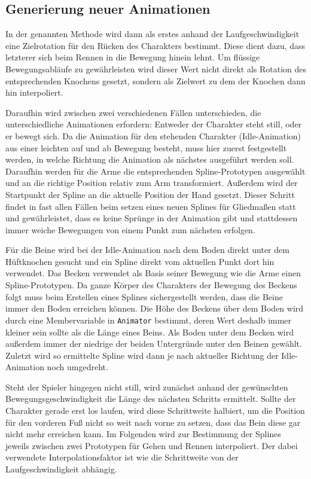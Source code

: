 \subsection{Generierung neuer Animationen}
In der genannten Methode wird dann als erstes anhand der Laufgeschwindigkeit eine Zielrotation für den Rücken des Charakters bestimmt. Diese dient dazu, dass letzterer sich beim Rennen in die Bewegung hinein lehnt. Um flüssige Bewegungsabläufe zu gewährleisten wird dieser Wert nicht direkt als Rotation des entsprechenden Knochens gesetzt, sondern als Zielwert zu dem der Knochen dann hin interpoliert.

Daraufhin wird zwischen zwei verschiedenen Fällen unterschieden, die unterschiedliche Animationen erfordern: Entweder der Charakter steht still, oder er bewegt sich. Da die Animation für den stehenden Charakter (Idle-Animation) aus einer leichten auf und ab Bewegung besteht, muss hier zuerst festgestellt werden, in welche Richtung die Animation als nächstes ausgeführt werden soll. Daraufhin werden für die Arme die entsprechenden Spline-Prototypen ausgewählt und an die richtige Position relativ zum Arm transformiert. Außerdem wird der Startpunkt der Spline an die aktuelle Position der Hand gesetzt. Dieser Schritt findet in fast allen Fällen beim setzen eines neuen Splines für Gliedmaßen statt und gewährleistet, dass es keine Sprünge in der Animation gibt und stattdessen immer weiche Bewegungen von einem Punkt zum nächsten erfolgen.

Für die Beine wird bei der Idle-Animation nach dem Boden direkt unter dem Hüftknochen gesucht und ein Spline direkt vom aktuellen Punkt dort hin verwendet. Das Becken verwendet als Basis seiner Bewegung wie die Arme einen Spline-Prototypen. Da ganze Körper des Charakters der Bewegung des Beckens folgt muss beim Erstellen eines Splines sichergestellt werden, dass die Beine immer den Boden erreichen können. Die Höhe des Beckens über dem Boden wird durch eine Membervariable in \lstinline{Animator} bestimmt, deren Wert deshalb immer kleiner sein sollte als die Länge eines Beins. Als Boden unter dem Becken wird außerdem immer der niedrige der beiden Untergründe unter den Beinen gewählt. Zuletzt wird so ermittelte Spline wird dann je nach aktueller Richtung der Idle-Animation noch umgedreht.

Steht der Spieler hingegen nicht still, wird zunächst anhand der gewünschten Bewegungsgeschwindigkeit die Länge des nächsten Schritts ermittelt. Sollte der Charakter gerade erst los laufen, wird diese Schrittweite halbiert, um die Position für den vorderen Fuß nicht so weit nach vorne zu setzen, dass das Bein diese gar nicht mehr erreichen kann. Im Folgenden wird zur Bestimmung der Splines jeweils zwischen zwei Prototypen für Gehen und Rennen interpoliert. Der dabei verwendete Interpolationsfaktor ist wie die Schrittweite von der Laufgeschwindigkeit abhängig.

